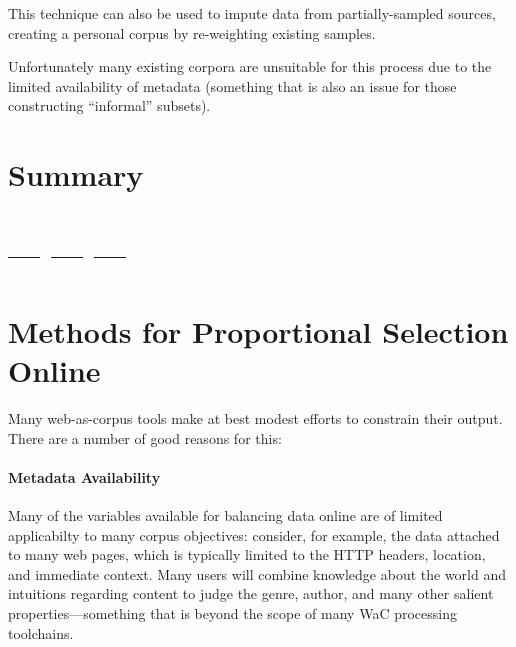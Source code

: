 This technique can also be used to impute data from partially-sampled sources, creating a personal corpus by re-weighting existing samples.

Unfortunately many existing corpora are unsuitable for this process due to the limited availability of metadata (something that is also an issue for those constructing ``informal'' subsets).






\section{Summary}













\section{--- --- ---}
% 
% 
% 
% 
\section{Methods for Proportional Selection Online}
Many web-as-corpus tools make at best modest efforts to constrain their output.  There are a number of good reasons for this:

\paragraph{Metadata Availability}
Many of the variables available for balancing data online are of limited applicabilty to many corpus objectives: consider, for example, the data attached to many web pages, which is typically limited to the HTTP headers, location, and immediate context.  Many users will combine knowledge about the world and intuitions regarding content to judge the genre, author, and many other salient properties---something that is beyond the scope of many WaC processing toolchains.


